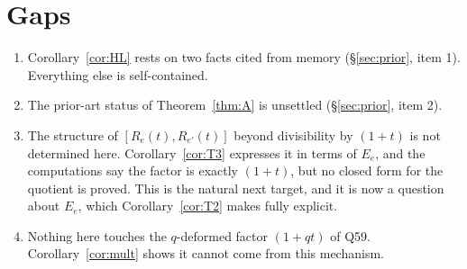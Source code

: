 \documentclass[11pt]{article}
\theoremstyle{definition}
\begin{document}
\section{Gaps}

\begin{enumerate}
\item Corollary~\ref{cor:HL} rests on two facts cited from memory (\S\ref{sec:prior}, item 1).
Everything else is self-contained.
\item The prior-art status of Theorem~\ref{thm:A} is unsettled (\S\ref{sec:prior}, item 2).
\item The structure of $[R_e(t),R_{e'}(t)]$ beyond divisibility by $(1+t)$ is not determined
here. Corollary~\ref{cor:T3} expresses it in terms of $E_e$, and the computations say the
factor is exactly $(1+t)$, but no closed form for the quotient is proved. This is the natural
next target, and it is now a question about $E_e$, which Corollary~\ref{cor:T2} makes fully
explicit.
\item Nothing here touches the $q$-deformed factor $(1+qt)$ of Q59. Corollary~\ref{cor:mult}
shows it cannot come from this mechanism.
\end{enumerate}
\end{document}
